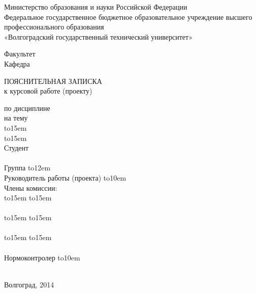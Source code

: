 \documentclass[a4paper,12pt]{extarticle}
\begin{document}
\begin{titlepage}
\newpage
\begin{center}
Министерство образования и науки Российской Федерации\\
Федеральное государственное бюджетное образовательное учреждение высшего профессионального образования\\
 «Волгоградский государственный технический университет»
\end{center}
\def\hrf#1{\hbox to#1{\hrulefill}}
Факультет \hrulefill\\
Кафедра \hrulefill
\begin{center}
ПОЯСНИТЕЛЬНАЯ ЗАПИСКА\\
к курсовой работе (проекту)
\end{center}
по дисциплине \hrulefill\\
на тему \hrulefill\\
 \hrf{15em}\hrulefill\\
 \hrf{15em}\hrulefill\\
Студент\hrulefill\\
\raisebox{15pt}{\hspace{7cm} {\small (фамилия, имя, отчество)} }\\
\vskip -1.5cm
Группа \hrf{12em}\\
Руководитель работы (проекта)  \hrf{10em} \hspace{0.5cm} \hrulefill\\
\raisebox{15pt}{\hspace{7cm} {\small (подпись и дата подписания)} \hspace{0.3cm}{\small (инициалы и фамилия)} }
\vskip -0.5cm
Члены комиссии:\\
\hrf{15em} \hspace{1cm} \hrf{15em}\\
\raisebox{15pt}{\hspace{1cm} {\small (подпись и дата подписания)} \hspace{4cm}{\small (инициалы и фамилия)} }\\
\hrf{15em} \hspace{1cm} \hrf{15em}\\
\raisebox{15pt}{\hspace{1cm} {\small (подпись и дата подписания)} \hspace{4cm}{\small (инициалы и фамилия)} }\\
\hrf{15em} \hspace{1cm} \hrf{15em}\\
\raisebox{15pt}{\hspace{1cm} {\small (подпись и дата подписания)} \hspace{4cm}{\small (инициалы и фамилия)} }\\
\vskip -1cm
Нормоконтролер \hrf{10em} \hspace{1cm} \hrulefill\\
\raisebox{15pt}{\hspace{5cm} {\small (подпись, дата)} \hspace{4cm}{\small (инициалы и фамилия)} }\\
\begin{center}
\vskip -0.9cm
Волгоград, 2014
\end{center}
\end{titlepage}

	\tableofcontents
\end{document}
